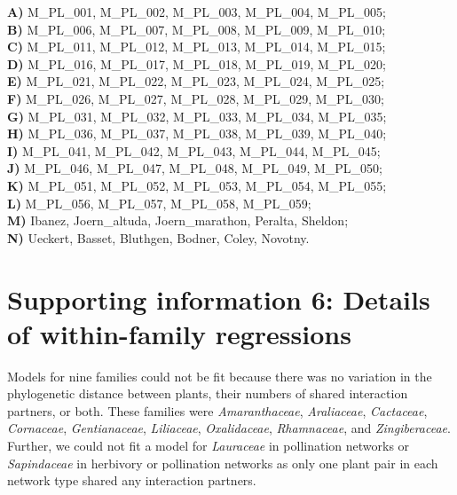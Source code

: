 \documentclass[12pt]{article}
\begin{document}
\begin{spacing}{1.5}
    \noindent \textbf{A)} M\_PL\_001, M\_PL\_002, M\_PL\_003, M\_PL\_004, M\_PL\_005;      \\
    \textbf{B)} M\_PL\_006, M\_PL\_007, M\_PL\_008, M\_PL\_009, M\_PL\_010;    \\
    \textbf{C)} M\_PL\_011, M\_PL\_012, M\_PL\_013, M\_PL\_014, M\_PL\_015;  \\
    \textbf{D)} M\_PL\_016, M\_PL\_017, M\_PL\_018, M\_PL\_019, M\_PL\_020;   \\
    \textbf{E)} M\_PL\_021, M\_PL\_022, M\_PL\_023, M\_PL\_024, M\_PL\_025;  \\
    \textbf{F)} M\_PL\_026, M\_PL\_027, M\_PL\_028, M\_PL\_029, M\_PL\_030;  \\
    \textbf{G)} M\_PL\_031, M\_PL\_032, M\_PL\_033, M\_PL\_034, M\_PL\_035; \\
    \textbf{H)} M\_PL\_036, M\_PL\_037, M\_PL\_038, M\_PL\_039, M\_PL\_040;   \\
    \textbf{I)} M\_PL\_041, M\_PL\_042, M\_PL\_043, M\_PL\_044, M\_PL\_045;\\
    \textbf{J)} M\_PL\_046, M\_PL\_047, M\_PL\_048, M\_PL\_049, M\_PL\_050;  \\
    \textbf{K)} M\_PL\_051, M\_PL\_052, M\_PL\_053, M\_PL\_054, M\_PL\_055;   \\
    \textbf{L)} M\_PL\_056, M\_PL\_057, M\_PL\_058, M\_PL\_059;  \\
    \textbf{M)} Ibanez, Joern\_altuda, Joern\_marathon, Peralta, Sheldon;  \\
    \textbf{N)} Ueckert, Basset, Bluthgen, Bodner, Coley, Novotny.

\clearpage

\section*{Supporting information 6: Details of within-family regressions}

    Models for nine families could not be fit because there was no variation in the phylogenetic distance between plants, their numbers of shared interaction partners, or both. These families were \emph{Amaranthaceae}, \emph{Araliaceae}, \emph{Cactaceae}, \emph{Cornaceae}, \emph{Gentianaceae}, \emph{Liliaceae}, \emph{Oxalidaceae}, \emph{Rhamnaceae}, and \emph{Zingiberaceae}. Further, we could not fit a model for \emph{Lauraceae} in pollination networks or \emph{Sapindaceae} in herbivory or pollination networks as only one plant pair in each network type shared any interaction partners.



\end{spacing}
\end{document}
